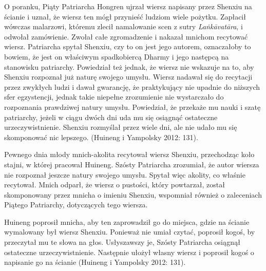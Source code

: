 O poranku, Piąty Patriarcha Hongren ujrzał wiersz napisany przez Shenxiu na ścianie i uznał, że wiersz ten mógł przynieść ludziom wiele pożytku. Zapłacił wówczas malarzowi, któremu zlecił namalowanie scen z sutry \textit{La\.nkāvatāra}, i odwołał zamówienie. Zwołał całe zgromadzenie i nakazał mnichom recytować wiersz. Patriarcha spytał Shenxiu, czy to on jest jego autorem, oznaczałoby to bowiem, że jest on właściwym spadkobiercą Dharmy i jego następcą na stanowisku patriarchy. Powiedział też jednak, że wiersz nie wskazuje na to, aby Shenxiu rozpoznał już naturę swojego umysłu. Wiersz nadawał się do recytacji przez zwykłych ludzi i dawał gwarancję, że praktykujący nie upadnie do niższych sfer egzystencji\fnm, jednak takie niepełne zrozumienie nie wystarczało do rozpoznania prawdziwej natury umysłu. Powiedział, że przekaże mu nauki i szatę patriarchy, jeżeli w ciągu dwóch dni uda mu się osiągnąć ostateczne urzeczywistnienie. Shenxiu rozmyślał przez wiele dni, ale nie udało mu się skomponować nic lepszego. (Huineng i Yampolsky 2012: 131).
%

Pewnego dnia młody mnich-akolita recytował wiersz Shenxiu, przechodząc koło stajni, w której pracował Huineng. Szósty Patriarcha zrozumiał, że autor wiersza nie rozpoznał jeszcze natury swojego umysłu. Spytał więc akolity, co właśnie recytował. Mnich odparł, że wiersz o pustości, który powtarzał, został skomponowany przez mnicha o imieniu Shenxiu, wspomniał również o zaleceniach Piątego Patriarchy, dotyczących tego wiersza.

Huineng poprosił mnicha, aby ten zaprowadził go do miejsca, gdzie na ścianie wymalowany był wiersz Shenxiu. Ponieważ nie umiał czytać, poprosił kogoś, by przeczytał mu te słowa na głos. Usłyszawszy je, Szósty Patriarcha osiągnął ostateczne urzeczywistnienie. Następnie ułożył własny wiersz i poprosił kogoś o napisanie go na ścianie (Huineng i Yampolsky 2012: 131).

